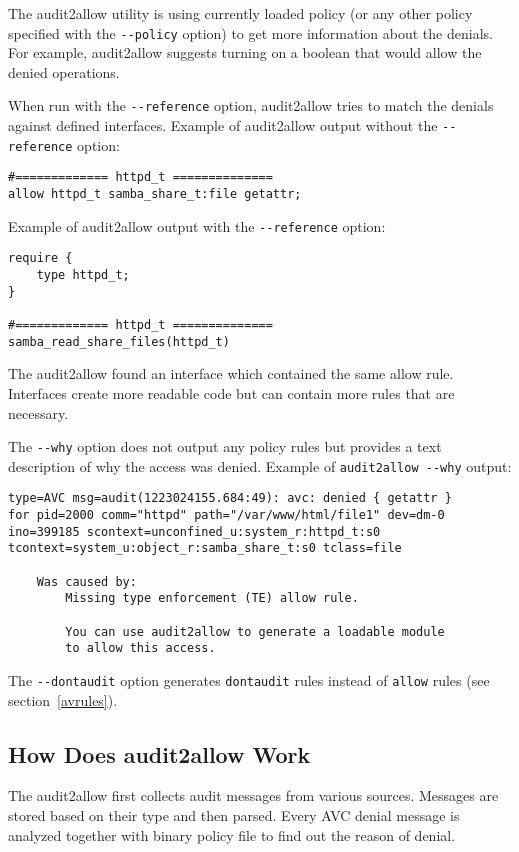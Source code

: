The audit2allow utility is using currently loaded policy (or any other policy
specified with the \texttt{-{}-policy} option) to get more information about the
denials. For example, audit2allow suggests turning on a boolean that would allow
the denied operations.

When run with the \texttt{-{}-reference} option, audit2allow tries to match the
denials against defined interfaces. Example of audit2allow output without the
\texttt{-{}-reference} option:
\begin{lstlisting}
#============= httpd_t ==============
allow httpd_t samba_share_t:file getattr;
\end{lstlisting}
Example of audit2allow output with the \texttt{-{}-reference} option:
\begin{lstlisting}
require {
	type httpd_t;
}

#============= httpd_t ==============
samba_read_share_files(httpd_t)
\end{lstlisting}
The audit2allow found an interface which contained the same allow rule.
Interfaces create more readable code but can contain more rules that are
necessary.

The \texttt{-{}-why} option does not output any policy rules but provides a text
description of why the access was denied. Example of \texttt{audit2allow
-{}-why} output:
\begin{lstlisting}
type=AVC msg=audit(1223024155.684:49): avc: denied { getattr }
for pid=2000 comm="httpd" path="/var/www/html/file1" dev=dm-0
ino=399185 scontext=unconfined_u:system_r:httpd_t:s0
tcontext=system_u:object_r:samba_share_t:s0 tclass=file

    Was caused by:
        Missing type enforcement (TE) allow rule.

        You can use audit2allow to generate a loadable module
        to allow this access.
\end{lstlisting}

The \texttt{-{}-dontaudit} option generates \texttt{dontaudit} rules instead of
\texttt{allow} rules (see section~\ref{avrules}).

\subsection{How Does audit2allow Work}
The audit2allow first collects audit messages from various sources. Messages are
stored based on their type and then parsed. Every AVC denial message is analyzed
together with binary policy file to find out the reason of denial.

